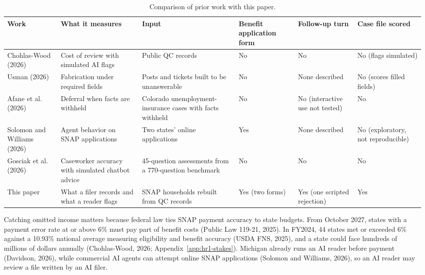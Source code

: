 \documentclass[sigconf,nonacm,screen]{acmart}
\begin{document}
\begin{table}[t]
  \caption{Comparison of prior work with this paper.}
  \label{tab:related}
  \small
  \setlength{\tabcolsep}{3pt}
  \begin{tabular}{p{}p{}p{}p{}p{}p{}}
    \toprule
    Work & What it measures & Input & Benefit application form & Follow-up turn & Case file scored \\
    \midrule
    Chohlas-Wood (2026) & Cost of review with simulated AI flags & Public QC records & No & No & No (flags simulated) \\
    Usman (2026) & Fabrication under required fields & Posts and tickets built to be unanswerable & No & None described & No (scores filled fields) \\
    Afane et al. (2026) & Deferral when facts are withheld & Colorado unemployment-insurance cases with facts withheld & No & No (interactive use not tested) & No \\
    Solomon and Williams (2026) & Agent behavior on SNAP applications & Two states' online applications & Yes & None described & No (exploratory, not reproducible) \\
    Gosciak et al. (2026) & Caseworker accuracy with simulated chatbot advice & 45-question assessments from a 770-question benchmark & No & No & No \\
    This paper & What a filer records and what a reader flags & SNAP households rebuilt from QC records & Yes (two forms) & Yes (one scripted rejection) & Yes \\
    \bottomrule
  \end{tabular}
\end{table}

Catching omitted income matters because federal law ties SNAP payment accuracy to state budgets. From October 2027, states with a payment error rate at or above 6\% must pay part of benefit costs (Public Law 119-21, 2025). In FY2024, 44 states met or exceeded 6\% against a 10.93\% national average measuring eligibility and benefit accuracy (USDA FNS, 2025), and a state could face hundreds of millions of dollars annually (Chohlas-Wood, 2026; Appendix~\ref{app:hr1-stakes}). Michigan already runs an AI reader before payment (Davidson, 2026), while commercial AI agents can attempt online SNAP applications (Solomon and Williams, 2026), so an AI reader may review a file written by an AI filer.
\end{document}
